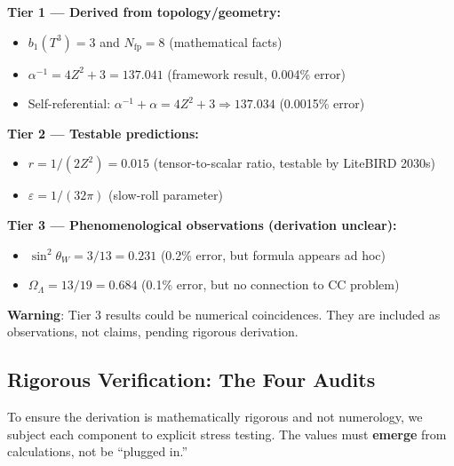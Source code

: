 \documentclass[12pt,a4paper]{article}
\newcommand{\Zsq}{Z^2}
\begin{document}
\begin{tcolorbox}[colback=red!5!white, colframe=red!60!black, title=Epistemic Classification of All Claims]
\textbf{Tier 1 --- Derived from topology/geometry:}
\begin{itemize}[itemsep=0pt]
    \item $b_1(T^3) = 3$ and $N_{\text{fp}} = 8$ (mathematical facts)
    \item $\alpha^{-1} = 4\Zsq + 3 = 137.041$ (framework result, 0.004\% error)
    \item Self-referential: $\alpha^{-1} + \alpha = 4\Zsq + 3 \Rightarrow 137.034$ (0.0015\% error)
\end{itemize}

\textbf{Tier 2 --- Testable predictions:}
\begin{itemize}[itemsep=0pt]
    \item $r = 1/(2\Zsq) = 0.015$ (tensor-to-scalar ratio, testable by LiteBIRD 2030s)
    \item $\varepsilon = 1/(32\pi)$ (slow-roll parameter)
\end{itemize}

\textbf{Tier 3 --- Phenomenological observations (derivation unclear):}
\begin{itemize}[itemsep=0pt]
    \item $\sin^2\theta_W = 3/13 = 0.231$ (0.2\% error, but formula appears ad hoc)
    \item $\Omega_\Lambda = 13/19 = 0.684$ (0.1\% error, but no connection to CC problem)
\end{itemize}

\textbf{Warning}: Tier 3 results could be numerical coincidences. They are included as observations, not claims, pending rigorous derivation.
\end{tcolorbox}

\subsection{Rigorous Verification: The Four Audits}

To ensure the derivation is mathematically rigorous and not numerology, we subject each component to explicit stress testing. The values must \textbf{emerge} from calculations, not be ``plugged in.''
\end{document}
